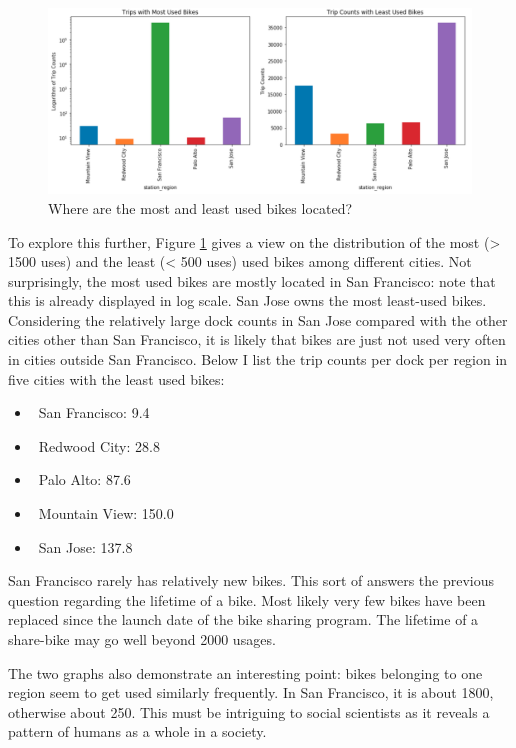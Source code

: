 \documentclass[a4paper]{article}
\begin{document}
			\begin{figure}
				\centering
				\includegraphics[width=1\textwidth]{BikeUsageRegions.png}
				\caption{\label{fig:bike_usage_region}Where are the most and least used bikes located?}
			\end{figure}				
			
			To explore this further, Figure \ref{fig:bike_usage_region} gives a view on the distribution of the most (> 1500 uses) and the least (< 500 uses) used bikes among different cities. Not surprisingly, the most used bikes are mostly located in San Francisco: note that this is already displayed in log scale. San Jose owns the most least-used bikes. Considering the relatively large dock counts in San Jose compared with the other cities other than San Francisco, it is likely that bikes are just not used very often in cities outside San Francisco. Below I list the trip counts per dock per region in five cities with the least used bikes:

			\begin{itemize}
				\item \ San Francisco: 9.4
				\item \ Redwood City: 28.8
				\item \ Palo Alto: 87.6
				\item \ Mountain View: 150.0
				\item \ San Jose: 137.8
			\end{itemize}    
			
			San Francisco rarely has relatively new bikes. This sort of answers the previous question regarding the lifetime of a bike. Most likely very few bikes have been replaced since the launch date of the bike sharing program. The lifetime of a share-bike may go well beyond 2000 usages. 
			
			The two graphs also demonstrate an interesting point: bikes belonging to one region seem to get used similarly frequently. In San Francisco, it is about 1800, otherwise about 250. This must be intriguing to social scientists as it reveals a pattern of humans as a whole in a society.
\end{document}
